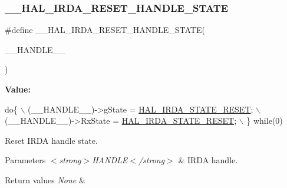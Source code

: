 \subsubsection{\texorpdfstring{\+\_\+\+\_\+\+H\+A\+L\+\_\+\+I\+R\+D\+A\+\_\+\+R\+E\+S\+E\+T\+\_\+\+H\+A\+N\+D\+L\+E\+\_\+\+S\+T\+A\+TE}{\_\_HAL\_IRDA\_RESET\_HANDLE\_STATE}}
{\footnotesize\ttfamily \#define \+\_\+\+\_\+\+H\+A\+L\+\_\+\+I\+R\+D\+A\+\_\+\+R\+E\+S\+E\+T\+\_\+\+H\+A\+N\+D\+L\+E\+\_\+\+S\+T\+A\+TE(\begin{DoxyParamCaption}\item[{}]{\+\_\+\+\_\+\+H\+A\+N\+D\+L\+E\+\_\+\+\_\+ }\end{DoxyParamCaption})}

{\bfseries Value\+:}
\begin{DoxyCode}
\textcolor{keywordflow}{do}\{                                                   \(\backslash\)
                                                       (\_\_HANDLE\_\_)->gState = 
      \hyperlink{group___i_r_d_a___exported___types_ggab3e65b75c9d4ae39bc50a31222509e1eaa004e82e1ca1d36b3dc84cf9441954dd}{HAL\_IRDA\_STATE\_RESET};      \(\backslash\)
                                                       (\_\_HANDLE\_\_)->RxState = 
      \hyperlink{group___i_r_d_a___exported___types_ggab3e65b75c9d4ae39bc50a31222509e1eaa004e82e1ca1d36b3dc84cf9441954dd}{HAL\_IRDA\_STATE\_RESET};     \(\backslash\)
                                                     \} \textcolor{keywordflow}{while}(0)
\end{DoxyCode}


Reset I\+R\+DA handle state. 


\begin{DoxyParams}{Parameters}
{\em $<$strong$>$\+H\+A\+N\+D\+L\+E$<$/strong$>$} & I\+R\+DA handle. \\
\hline
\end{DoxyParams}

\begin{DoxyRetVals}{Return values}
{\em None} & \\
\hline
\end{DoxyRetVals}
\mbox{\label{group___i_r_d_a___exported___macros_ga569f44033f99248f209c83c75e65fa8a}} 
